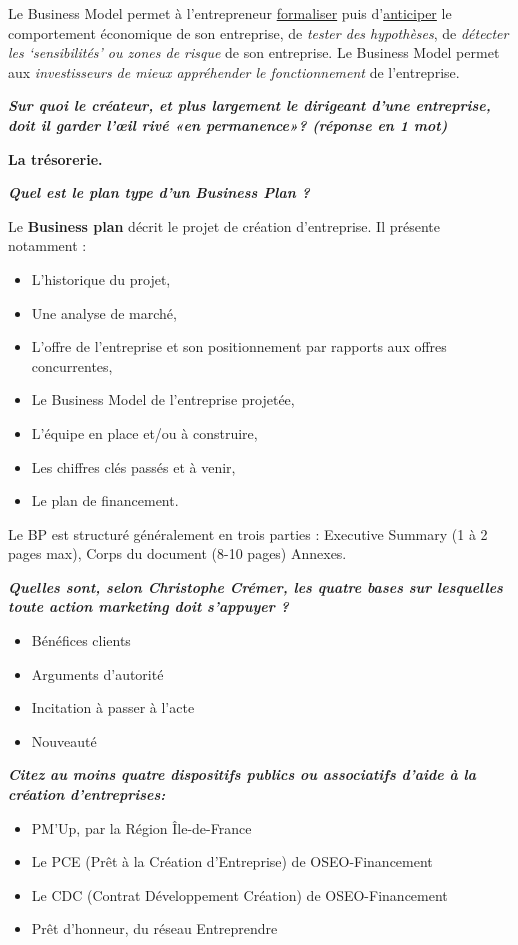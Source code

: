 \documentclass[12pt,oneside,a4paper]{article}
\begin{document}
Le Business Model permet à l’entrepreneur \underline{formaliser} puis d’\underline{anticiper} le comportement économique de son entreprise, de \emph{tester des hypothèses}, de \emph{détecter les `sensibilités' ou zones de risque} de son entreprise.
Le Business Model permet aux \emph{investisseurs de mieux appréhender le fonctionnement} de l’entreprise.


\textbf{\emph{Sur quoi le créateur, et plus largement le dirigeant d’une entreprise, doit il garder l’œil rivé «en permanence»? (réponse en 1 mot)}}

\textbf{La trésorerie.}


\textbf{\emph{Quel est le plan type d’un Business Plan ?}}

Le \textbf{Business plan} décrit le projet de création d’entreprise. Il présente notamment :

\begin{itemize}[label=]
	\item L’historique du projet,
	\item Une analyse de marché,
	\item L’offre de l’entreprise et son positionnement par rapports aux offres concurrentes,
	\item Le Business Model de l’entreprise projetée,
	\item L’équipe en place et/ou à construire,
	\item Les chiffres clés passés et à venir,
	\item Le plan de financement.	
\end{itemize}

Le BP est structuré généralement en trois parties : Executive Summary (1 à 2 pages max), Corps du document (8-10 pages) Annexes.

\textbf{\emph{Quelles sont, selon Christophe Crémer, les quatre bases sur lesquelles toute action marketing doit s’appuyer ?}}

\begin{itemize}[label=]
	\item Bénéfices clients
	\item Arguments d’autorité
	\item Incitation à passer à l’acte
	\item Nouveauté	
\end{itemize}

\textbf{\emph{Citez au moins quatre dispositifs publics ou associatifs d'aide à la création d'entreprises:}}

\begin{itemize}[label=]
    \item PM'Up, par la Région Île-de-France
    \item Le PCE (Prêt à la Création d'Entreprise) de OSEO-Financement
    \item Le CDC (Contrat Développement Création) de OSEO-Financement
    \item Prêt d'honneur, du réseau Entreprendre
\end{itemize}
\end{document}
